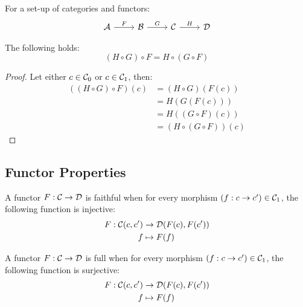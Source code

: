 \begin{theorem}
  For a set-up of categories and functors:
  \[\begin{tikzcd}[ampersand replacement=\&]
    \A \& \B \& \C \& \D
    \arrow["F", from=1-1, to=1-2]
    \arrow["G", from=1-2, to=1-3]
    \arrow["H", from=1-3, to=1-4]
  \end{tikzcd}\]

  The following holds:
  \[(H \circ G) \circ F = H\circ(G\circ F)\]

  \begin{proof}
    Let either $c\in \mathcal{C}_0$ or $c\in \mathcal{C}_1$, then:
    \[
      \begin{aligned}
        ((H \circ G) \circ F) (c)
          &= (H\circ G) (F (c))\\
          &= H(G(F(c)))\\
          &= H((G\circ F)(c))\\
          &= (H\circ(G\circ F)) (c)
      \end{aligned}
    \]
  \end{proof}
\end{theorem}

\subsection{Functor Properties}

\begin{definition}
  A functor $F:\mathcal{C}\to \mathcal{D}$ is faithful when for every morphism $(f: c\to c') \in
  \mathcal{C}_1$, the following function is injective:
  \parencite{leinster:basic_category_theory}
    \[
      \begin{aligned}
        F: \mathcal{C}(c, c') &\to \mathcal{D}(F(c), F(c'))\\
        f &\mapsto F(f)
      \end{aligned}
    \]
\end{definition}

\begin{definition}
  A functor $F:\mathcal{C}\to \mathcal{D}$ is full when for every morphism $(f: c\to c') \in
  \mathcal{C}_1$, the following function is surjective:
  \parencite{leinster:basic_category_theory}
  \[
    \begin{aligned}
      F: \mathcal{C}(c, c') &\to \mathcal{D}(F(c), F(c'))\\
      f &\mapsto F(f)
    \end{aligned}
  \]
\end{definition}


